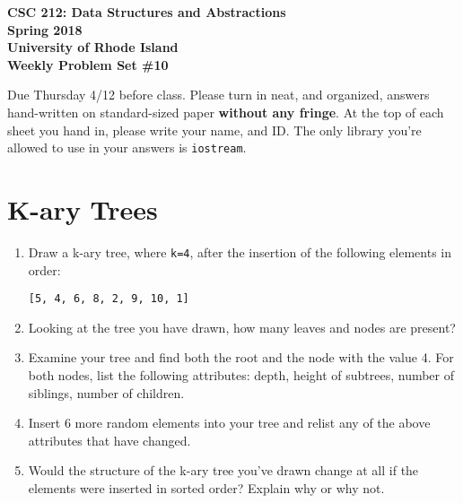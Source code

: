 \documentclass[11pt]{article}
\begin{document}
\thispagestyle{empty}

\begin{center}
    {\Large\bf CSC 212: Data Structures and Abstractions}\\
    \medskip
    {\Large\bf Spring 2018}\\
    \medskip
    {\Large\bf University of Rhode Island}\\
    \bigskip
    {\Large\bf Weekly Problem Set \#10}
\end{center}

Due Thursday 4/12 before class. Please turn in neat, and organized, answers hand-written on standard-sized paper \textbf{without any fringe}. At the top of each sheet you hand in, please write your name, and ID.
The only library you're allowed to use in your answers is \verb|iostream|.

\section{K-ary Trees}
\begin{enumerate}
    \item Draw a k-ary tree, where \verb|k=4|, after the insertion of the following elements in order: 
    
    \verb|[5, 4, 6, 8, 2, 9, 10, 1]|
    
    \item Looking at the tree you have drawn, how many leaves and nodes are present? 
    
    \item Examine your tree and find both the root and the node with the value 4. For both nodes, list the following attributes: depth, height of subtrees, number of siblings, number of children. 
    
    \item Insert 6 more random elements into your tree and relist any of the above attributes that have changed.
    
    \item Would the structure of the k-ary tree you've drawn change at all if the elements were inserted in sorted order? Explain why or why not.
\end{enumerate}
\end{document}
